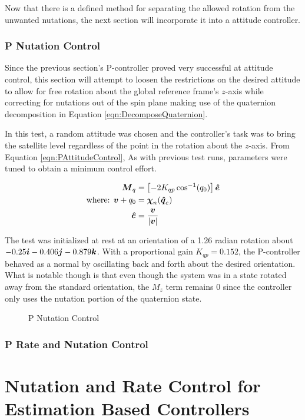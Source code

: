 Now that there is a defined method for separating the allowed rotation from the unwanted nutations, the next section will incorporate it into a attitude controller.

\subsubsection{P Nutation Control}
\label{subsubsec:PNutationControl}

Since the previous section's P-controller proved very successful at attitude control, this section will attempt to loosen the restrictions on the desired attitude to allow for free rotation about the global reference frame's $z$-axis while correcting for nutations out of the spin plane making use of the quaternion decomposition in Equation \ref{eqn:DecomposeQuaternion}.

In this test, a random attitude was chosen and the controller's task was to bring the satellite level regardless of the point in the rotation about the $z$-axis.  From Equation \ref{eqn:PAttitudeControl},    As with previous test runs, parameters were tuned to obtain a minimum control effort.

\begin{subequations}
  \begin{align}
    \boldsymbol{M}_{q} &= \left[-2 K_{qp} \cos^{-1} (q_{0}) \right] \boldsymbol{\hat{e}} \\
    \text{where: } \boldsymbol{v} + q_0 &= \boldsymbol{\chi}_n(\boldsymbol{\hat{q}}_e)\\
    \boldsymbol{\hat{e}} &= \frac{\boldsymbol{v}}{|\boldsymbol{v}|}
  \end{align}
  \label{eqn:PNutationControl}
\end{subequations}

The test was initialized at rest at an orientation of a 1.26 radian rotation about $-0.25 \boldsymbol{i} -0.406\boldsymbol{j} -0.879\boldsymbol{k}$.  With a proportional gain $K_{qp} = 0.152$, the P-controller behaved as a normal by oscillating back and forth about the desired orientation.  What is notable though is that even though the system was in a state rotated away from the standard orientation, the $M_z$ term remains 0 since the controller only uses the nutation portion of the quaternion state.

\begin{figure}[H]
  \centerline{}
  \caption{P Nutation Control}
  \label{fig:PNutationControl}
\end{figure}

\subsubsection{P Rate and Nutation Control}
\label{subsubsec:PRateNutationControl}


\section{Nutation and Rate Control for Estimation Based Controllers}
\label{sec:NutationandRateControlforEstimationBasedControllers}

